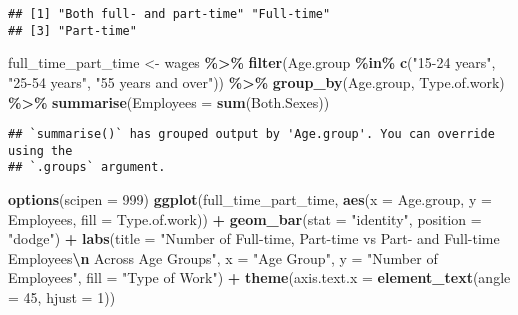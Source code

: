 \documentclass[
]{article}
\newenvironment{Shaded}{\begin{snugshade}}{\end{snugshade}}
\newcommand{\AttributeTok}[1]{\textcolor[rgb]{0.13,0.29,0.53}{#1}}
\newcommand{\DecValTok}[1]{\textcolor[rgb]{0.00,0.00,0.81}{#1}}
\newcommand{\FunctionTok}[1]{\textcolor[rgb]{0.13,0.29,0.53}{\textbf{#1}}}
\newcommand{\NormalTok}[1]{#1}
\newcommand{\OtherTok}[1]{\textcolor[rgb]{0.56,0.35,0.01}{#1}}
\newcommand{\SpecialCharTok}[1]{\textcolor[rgb]{0.81,0.36,0.00}{\textbf{#1}}}
\newcommand{\StringTok}[1]{\textcolor[rgb]{0.31,0.60,0.02}{#1}}
\begin{document}
\begin{Shaded}
\end{Shaded}

\begin{verbatim}
## [1] "Both full- and part-time" "Full-time"               
## [3] "Part-time"
\end{verbatim}

\begin{Shaded}
\begin{Highlighting}[]
\NormalTok{full\_time\_part\_time }\OtherTok{\textless{}{-}}\NormalTok{ wages }\SpecialCharTok{\%\textgreater{}\%} 
  \FunctionTok{filter}\NormalTok{(Age.group }\SpecialCharTok{\%in\%} \FunctionTok{c}\NormalTok{(}\StringTok{"15{-}24 years"}\NormalTok{, }
                          \StringTok{"25{-}54 years"}\NormalTok{, }
                          \StringTok{"55 years and over"}\NormalTok{)) }\SpecialCharTok{\%\textgreater{}\%}
  \FunctionTok{group\_by}\NormalTok{(Age.group, Type.of.work) }\SpecialCharTok{\%\textgreater{}\%}
  \FunctionTok{summarise}\NormalTok{(}\AttributeTok{Employees =} \FunctionTok{sum}\NormalTok{(Both.Sexes))}
\end{Highlighting}
\end{Shaded}

\begin{verbatim}
## `summarise()` has grouped output by 'Age.group'. You can override using the
## `.groups` argument.
\end{verbatim}

\begin{Shaded}
\begin{Highlighting}[]
\FunctionTok{options}\NormalTok{(}\AttributeTok{scipen =} \DecValTok{999}\NormalTok{)}
\FunctionTok{ggplot}\NormalTok{(full\_time\_part\_time, }
       \FunctionTok{aes}\NormalTok{(}\AttributeTok{x =}\NormalTok{ Age.group, }\AttributeTok{y =}\NormalTok{ Employees, }\AttributeTok{fill =}\NormalTok{ Type.of.work)) }\SpecialCharTok{+}
  \FunctionTok{geom\_bar}\NormalTok{(}\AttributeTok{stat =} \StringTok{"identity"}\NormalTok{, }\AttributeTok{position =} \StringTok{"dodge"}\NormalTok{) }\SpecialCharTok{+}
  \FunctionTok{labs}\NormalTok{(}\AttributeTok{title =} \StringTok{"Number of Full{-}time, Part{-}time vs Part{-} and Full{-}time Employees}\SpecialCharTok{\textbackslash{}n}\StringTok{ Across Age Groups"}\NormalTok{,}
       \AttributeTok{x =} \StringTok{"Age Group"}\NormalTok{,}
       \AttributeTok{y =} \StringTok{"Number of Employees"}\NormalTok{,}
       \AttributeTok{fill =} \StringTok{"Type of Work"}\NormalTok{) }\SpecialCharTok{+}
  \FunctionTok{theme}\NormalTok{(}\AttributeTok{axis.text.x =} \FunctionTok{element\_text}\NormalTok{(}\AttributeTok{angle =} \DecValTok{45}\NormalTok{, }\AttributeTok{hjust =} \DecValTok{1}\NormalTok{))}
\end{Highlighting}
\end{Shaded}
\end{document}

